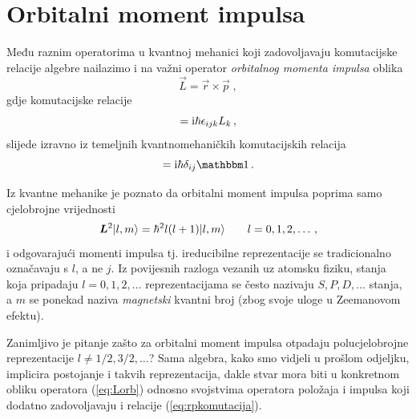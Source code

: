 \section{Orbitalni moment impulsa}

Među raznim operatorima u kvantnoj mehanici koji zadovoljavaju
komutacijske relacije  algebre nailazimo i na važni
operator \emph{orbitalnog momenta impulsa} oblika 
\begin{equation}
\vec{L} = \vec{r} \times \vec{p} \;,
\label{eq:Lorb}
\end{equation}
gdje  komutacijske relacije 
\begin{equation}
    [L_i, L_j] = \rmi \hbar \epsilon_{ijk} L_k \,,
\end{equation}
slijede izravno iz
temeljnih kvantnomehaničkih komutacijskih relacija
\begin{equation}
    [r_i, p_j] = \rmi\hbar \delta_{ij} \Eins \,.
    \label{eq:rpkomutacija}
\end{equation}

Iz kvantne mehanike je poznato da orbitalni moment impulsa
poprima samo cjelobrojne vrijednosti 
\begin{equation}
     \vec{L}^2 \ket{l, m} = \hbar^2 l(l+1) \ket{l,m} \qquad l=0,1,2,\ldots\,,
\end{equation}
i odgovarajući momenti impulsa tj. ireducibilne
reprezentacije se tradicionalno označavaju s $l$, a ne $j$.
Iz povijesnih razloga vezanih uz atomsku fiziku, stanja koja
pripadaju $l=0,1,2,\ldots$ reprezentacijama
se često nazivaju $S, P, D,\ldots$ stanja, a $m$ se ponekad naziva
\emph{magnetski} kvantni broj (zbog svoje uloge u Zeemanovom efektu).

Zanimljivo je pitanje zašto za orbitalni moment impulsa otpadaju
polucjelobrojne reprezentacije $l \neq 1/2, 3/2, \ldots$?
    Sama algebra, kako smo vidjeli u prošlom odjeljku, implicira
postojanje i takvih reprezentacija, dakle stvar mora biti u konkretnom
obliku operatora (\ref{eq:Lorb}) odnosno svojstvima operatora
položaja i impulsa koji dodatno zadovoljavaju i relacije
(\ref{eq:rpkomutacija}).

